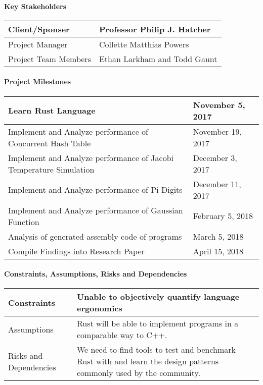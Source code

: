 \documentclass[10pt,a4paper]{report}
\begin{document}
\paragraph{Key Stakeholders}
\begin{flushleft}
	\begin{tabulary}{\textwidth}{ | L | L | }
		\hline
		Client/Sponser & Professor Philip J. Hatcher \\
		\hline
		Project Manager & Collette Matthias Powers \\
		\hline
		Project Team Members & Ethan Larkham and Todd Gaunt \\
		\hline
	\end{tabulary}
\end{flushleft}
\paragraph{Project Milestones}
\begin{flushleft}
	\begin{tabulary}{\textwidth}{ | L | L | }
		\hline
		Learn Rust Language & November 5, 2017 \\
		\hline
		Implement and Analyze performance of Concurrent Hash Table
		& November 19, 2017 \\
		\hline
		Implement and Analyze performance of Jacobi Temperature
		Simulation & December 3, 2017 \\
		\hline
		Implement and Analyze performance of Pi Digits & December 11,
		2017 \\
		\hline
		Implement and Analyze performance of Gaussian Function &
		February 5, 2018 \\
		\hline
		Analysis of generated assembly code of programs &
		March 5, 2018 \\
		\hline
		Compile Findings into Research Paper & April 15, 2018 \\
		\hline
	\end{tabulary}
\end{flushleft}
\paragraph{Constraints, Assumptions, Risks and Dependencies}
\begin{flushleft}
	\begin{tabulary}{\textwidth}{ | L | L | }
		\hline
		Constraints & Unable to objectively quantify language
		ergonomics \\
		\hline
		Assumptions & Rust will be able to implement programs in a
		comparable way to C++. \\
		\hline
		Risks and Dependencies & We need to find tools to test and
    benchmark Rust with and learn the design patterns commonly
    used by the community. \\
		\hline
	\end{tabulary}
\end{flushleft}
\end{document}
